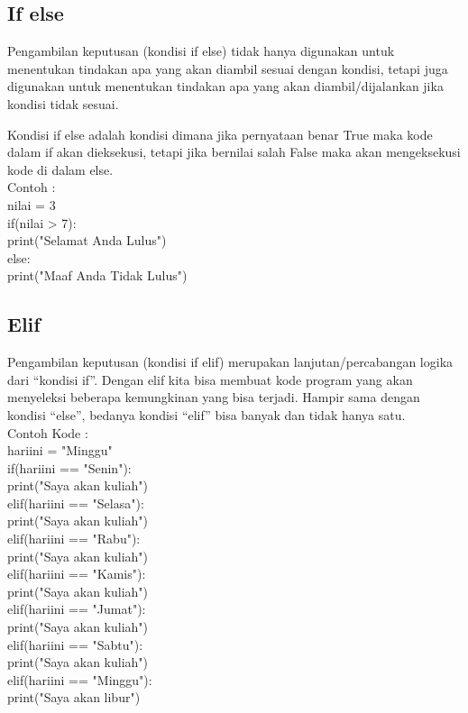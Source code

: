 \subsection{If else}
Pengambilan keputusan (kondisi if else) tidak hanya digunakan untuk menentukan tindakan apa yang akan diambil sesuai dengan kondisi, tetapi juga digunakan untuk menentukan tindakan apa yang akan diambil/dijalankan jika kondisi tidak sesuai.

Kondisi if else adalah kondisi dimana jika pernyataan benar True maka kode dalam if akan dieksekusi, tetapi jika bernilai salah False maka akan mengeksekusi kode di dalam else.\\
Contoh :\\
nilai = 3\\
if(nilai > 7):\\
    print("Selamat Anda Lulus")\\
else:\\
    print("Maaf Anda Tidak Lulus")\\
    
\subsection{Elif}
Pengambilan keputusan (kondisi if elif) merupakan lanjutan/percabangan logika dari “kondisi if”. Dengan elif kita bisa membuat kode program yang akan menyeleksi beberapa kemungkinan yang bisa terjadi. Hampir sama dengan kondisi “else”, bedanya kondisi “elif” bisa banyak dan tidak hanya satu.\\
Contoh Kode :\\
hariini = "Minggu"\\
if(hariini == "Senin"):\\
    print("Saya akan kuliah")\\
elif(hariini == "Selasa"):\\
    print("Saya akan kuliah")\\
elif(hariini == "Rabu"):\\
    print("Saya akan kuliah")\\
elif(hariini == "Kamis"):\\
    print("Saya akan kuliah")\\
elif(hariini == "Jumat"):\\
    print("Saya akan kuliah")\\
elif(hariini == "Sabtu"):\\
    print("Saya akan kuliah")\\
elif(hariini == "Minggu"):\\
    print("Saya akan libur")\\
    
